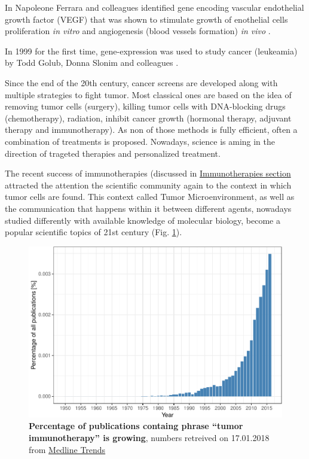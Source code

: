 \documentclass[12pt,]{book}
\theoremstyle{definition}
\theoremstyle{definition}
\theoremstyle{definition}
\theoremstyle{remark}
\begin{document}
In Napoleone Ferrara and colleagues identified gene encoding vascular
endothelial growth factor (VEGF) that was shown to stimulate growth of
enothelial cells proliferation \emph{in vitro} and angiogenesis (blood
vessels formation) \emph{in vivo} \citep{Leung1989}.

In 1999 for the first time, gene-expression was used to study cancer
(leukeamia) by Todd Golub, Donna Slonim and colleagues
\citep{Golub1999}.

Since the end of the 20th century, cancer screens are developed along
with multiple strategies to fight tumor. Most classical ones are based
on the idea of removing tumor cells (surgery), killing tumor cells with
DNA-blocking drugs (chemotherapy), radiation, inhibit cancer growth
(hormonal therapy, adjuvant therapy and immunotherapy). As non of those
methods is fully efficient, often a combination of treatments is
proposed. Nowadays, science is aming in the direction of trageted
therapies and personalized treatment.

The recent success of immunotherapies (discussed in
\protect\hyperlink{immunotherapies}{Immunotherapies section} attracted
the attention the scientific community again to the context in which
tumor cells are found. This context called Tumor Microenvironment, as
well as the communication that happens within it between different
agents, nowadays studied differently with available knowledge of
molecular biology, become a popular scientific topics of 21st century
(Fig. \ref{fig:pubmedTME}).

\begin{figure}

{\centering \includegraphics[width=0.7\linewidth]{UCzPhDThesis_files/figure-latex/pubmedTME-1} 

}

\caption{\textbf{Percentage of publications containg
phrase ``tumor immunotherapy'' is growing}, numbers retreived on
17.01.2018 from \href{http://dan.corlan.net/medline-trend.html}{Medline
Trends} \citep{Corlan2004}}\label{fig:pubmedTME}
\end{figure}
\end{document}
